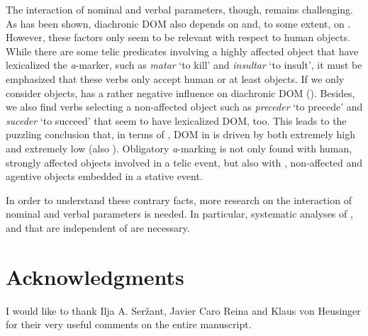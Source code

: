 \documentclass[output=paper]{LSP/langsci}
\begin{document}
The interaction of nominal and verbal parameters, though, remains challenging. As has been shown, diachronic DOM also depends on  and, to some extent, on . However, these factors only seem to be relevant with respect to human objects. While there are some telic predicates involving a highly affected object that have lexicalized the \textit{a}-marker, such as \textit{matar} ‘to kill’ and \textit{insultar} ‘to insult’, it must be emphasized that these verbs only accept human or at least  objects. If we only consider  objects,  has a rather negative influence on diachronic DOM (\cf {}). Besides, we also find  verbs selecting a non-affected object such as \textit{preceder} ‘to precede’ and \textit{suceder} ‘to succeed’ that seem to have lexicalized DOM, too. This leads to the puzzling conclusion that, in terms of \citet{Hopperetal1980Transitivity}, DOM in  is driven by both extremely high and extremely low  (\cf also \citealt[67]{Fabregas2013Differential}). Obligatory \textit{a}-marking is not only found with human, strongly affected objects involved in a telic event, but also with , non-affected and agentive objects embedded in a stative event. 

In order to understand these contrary facts, more research on the interaction of nominal and verbal parameters is needed. In particular, systematic analyses of ,  and  that are independent of  are necessary. 

\section*{Acknowledgments}
I would like to thank Ilja A. Seržant, Javier Caro Reina and Klaus von Heusinger for their very useful comments on the entire manuscript.

 
{\sloppy
\printbibliography[heading=subbibliography,notkeyword=this] }
\end{document}
